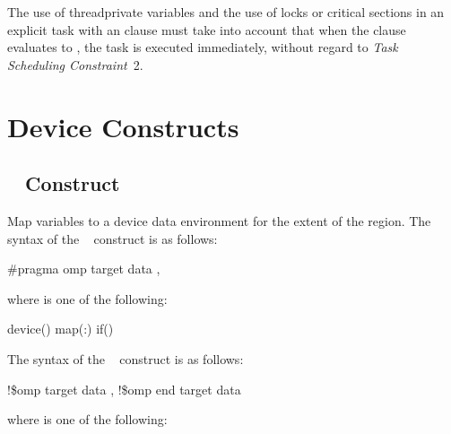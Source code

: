 The use of threadprivate variables and the use of locks or critical sections in an explicit 
task with an  clause must take into account that when the  clause evaluates to 
, the task is executed immediately, without regard to \emph{Task Scheduling Constraint}~2.
\noteend








\section{Device Constructs}
\label{sec:Device Constructs}
\subsection{~ Construct}
\label{subsec:target data Construct}
\summary
 Map variables to a device data environment for the extent of the region.
\syntax
\ccppspecificstart
The syntax of the ~ construct is as follows:

\begin{boxedcode}
\#pragma omp target data \plc{[clause[ [},\plc{] clause] } \plc{... ] new-line}
\end{boxedcode}

\begin{samepage}
where  is one of the following:

\begin{indentedcodelist}
device()
map(\plc{[[map-type-modifier[,]] map-type}:\plc{ ] list})
if()
\end{indentedcodelist}
\ccppspecificend
\medskip
\end{samepage}

\fortranspecificstart
The syntax of the ~ construct is as follows:

\begin{boxedcode}
!\$omp target data \plc{[clause[ [},\plc{] clause] ... ]}
!\$omp end target data
\end{boxedcode}

where  is one of the following:


